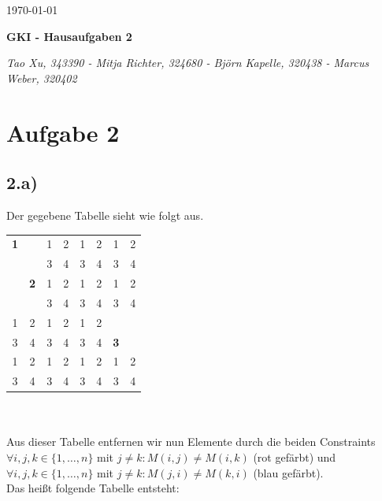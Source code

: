 \documentclass[a4paper]{article}
\begin{document}
  \begin{flushright}
    \today
  \end{flushright}
  \begin{center}
    \Large\textbf{{GKI - Hausaufgaben 2}}\\
  \end{center}

  \begin{center}
        \large\textsl{Tao Xu, 343390 - Mitja Richter, 324680 - Björn Kapelle, 320438 - Marcus Weber, 320402}\\
  \end{center}


\section*{Aufgabe 2}
\subsection*{2.a)}
Der gegebene Tabelle sieht wie folgt aus.\\

\begin{tabular}{|cc|cc|cc|cc|}
\hline
\textbf{1} &  & 1 & 2 & 1 & 2 & 1 & 2\\
  &  & 3 & 4 & 3 & 4 & 3 & 4\\
\hline
 & \textbf{2} & 1 & 2 & 1 & 2 & 1 & 2\\
  &  & 3 & 4 & 3 & 4 & 3 & 4\\
\hline
1 & 2 & 1 & 2 & 1 & 2 &  & \\
 3 & 4 & 3 & 4 & 3 & 4 & \textbf{3} & \\
\hline
1 & 2 & 1 & 2 & 1 & 2 & 1 & 2\\
 3 & 4 & 3 & 4 & 3 & 4 & 3 & 4\\
\hline
\end{tabular} \\
\\
Aus dieser Tabelle entfernen wir nun Elemente durch die beiden Constraints \\
$\forall i,j,k \in \{ 1, \ldots ,n\}$ mit $j \ne k: M(i,j) \ne M(i,k)$ (rot gef\"arbt) und \\
$\forall i,j,k \in \{ 1, \ldots ,n\}$ mit $j \ne k: M(j,i) \ne M(k,i)$ (blau gef\"arbt).\\
Das hei\ss t folgende Tabelle entsteht:\\
\end{document}
